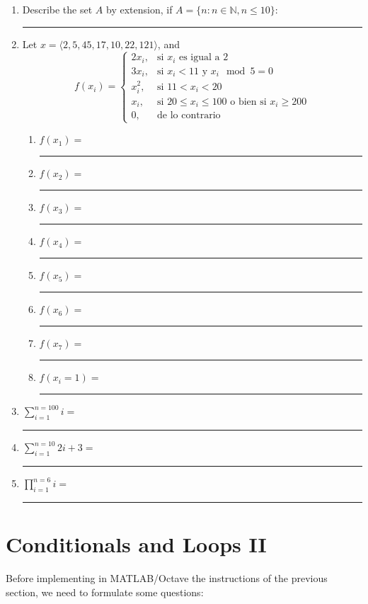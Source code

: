 \documentclass[spanish, 10pt]{article}
\newcommand{\responserule}{{\large\rule{14 cm}{0.3mm}}}
\newcommand{\shortresponserule}{{\large\rule{5 cm}{0.3mm}}}
\begin{document}
\begin{enumerate}
    \itemsep2.5ex
    \item Describe the set $A$ by extension, if $A = \{ n : n \in \mathbb{N}, n \leq 10 \}$: \\[3ex] \responserule
    \item Let $x = \langle 2, 5, 45, 17, 10, 22, 121 \rangle$, and 
    $$f(x_i) =
        \begin{cases}
            2x_i, & \text{si } x_i \text{ es igual a } 2 \\
            3x_i, & \text{si } x_i < 11 \text{ y } x_i \mod 5 = 0 \\
            x_i^2, & \text{si } 11 < x_i < 20 \\
            x_i, & \text{si } 20 \leq x_i \leq 100 \text{ o bien si } x_i \geq 200 \\
            0, & \text{de lo contrario}
        \end{cases}$$
        \bigskip
    \begin{enumerate}
        \item $f(x_1) =$ \quad \; \shortresponserule
        \item $f(x_2) =$ \quad \; \shortresponserule
        \item $f(x_3) =$ \quad \; \shortresponserule
        \item $f(x_4) =$ \quad \; \shortresponserule
        \item $f(x_5) =$ \quad \; \shortresponserule
        \item $f(x_6) =$ \quad \; \shortresponserule
        \item $f(x_7) =$ \quad \; \shortresponserule
        \item $f(x_i=1) =$ \shortresponserule
    \end{enumerate}
    \item {\Large $\sum \limits_{i=1}^{n=100} i =$} \hfill \shortresponserule
    \item {\Large $\sum \limits_{i=1}^{n=10} 2i + 3 =$} \hfill \shortresponserule
    \item {\Large $\prod \limits_{i=1}^{n=6} i =$} \hfill \shortresponserule
\end{enumerate}

\section{Conditionals and Loops II}

Before implementing in MATLAB/Octave the instructions of the previous section, we need to formulate some questions:
\end{document}
